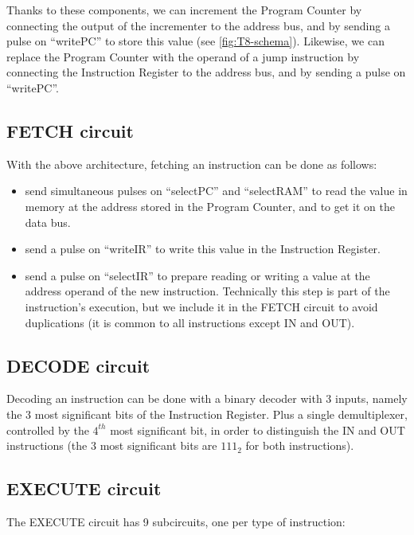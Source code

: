 Thanks to these components, we can increment the Program Counter by connecting
the output of the incrementer to the address bus, and by sending a pulse on
``writePC'' to store this value (see \cref{fig:T8-schema}). Likewise, we can
replace the Program Counter with the operand of a jump instruction by
connecting the Instruction Register to the address bus, and by sending a pulse
on ``writePC''.

\subsection{FETCH circuit}

With the above architecture, fetching an instruction can be done as follows:
\begin{itemize}
  \item send simultaneous pulses on ``selectPC'' and ``selectRAM'' to read the
  value in memory at the address stored in the Program Counter, and to get it
  on the data bus.

  \item send a pulse on ``writeIR'' to write this value in the Instruction
  Register.

  \item send a pulse on ``selectIR'' to prepare reading or writing a value at
  the address operand of the new instruction. Technically this step is part of
  the instruction's execution, but we include it in the FETCH circuit to
  avoid duplications (it is common to all instructions except IN and OUT).
\end{itemize}

\subsection{DECODE circuit}

Decoding an instruction can be done with a binary decoder with 3 inputs, namely
the 3 most significant bits of the Instruction Register. Plus a single
demultiplexer, controlled by the $4^{th}$ most significant bit, in order to
distinguish the IN and OUT instructions (the 3 most significant bits are
$111_2$ for both instructions).

\subsection{EXECUTE circuit}

The EXECUTE circuit has 9 subcircuits, one per type of instruction:

